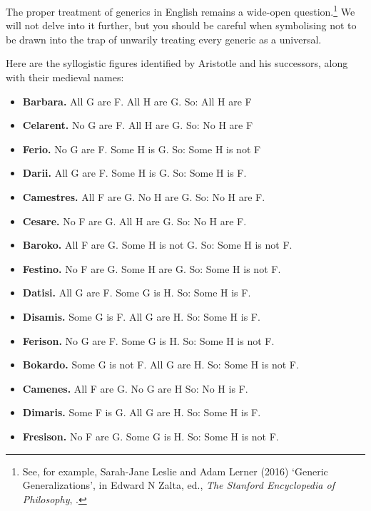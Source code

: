 The proper treatment of generics in English remains a wide-open question.\footnote{See, for example, Sarah-Jane Leslie and Adam Lerner (2016) `Generic Generalizations', in Edward N Zalta, ed., \emph{The Stanford Encyclopedia of Philosophy}, .} We will not delve into it further, but you should be careful when symbolising not to be drawn into the trap of unwarily treating every generic as a universal.




\practiceproblems
\problempart
\label{pr.BarbaraEtc}
Here are the syllogistic figures identified by Aristotle and his successors, along with their medieval names:
\begin{itemize}
	\item \textbf{Barbara.} All G are F. All H are G. So:  All H are F
	\item \textbf{Celarent.} No G are F. All H are G. So: No H are F
	\item \textbf{Ferio.} No G are F. Some H is G. So: Some H is not F
	\item \textbf{Darii.} All G are F. Some H is G. So: Some H is F.
	\item \textbf{Camestres.} All F are G. No H are G. So: No H are F.
	\item \textbf{Cesare.} No F are G. All H are G. So: No H are F.
	\item \textbf{Baroko.} All F are G. Some H is not G. So: Some H is not F.
	\item \textbf{Festino.} No F are G. Some H are G. So: Some H is not F.
	\item \textbf{Datisi.} All G are F. Some G is H. So: Some H is F.
	\item \textbf{Disamis.} Some G is F. All G are H. So: Some H is F.
	\item \textbf{Ferison.} No G are F. Some G is H. So: Some H is not F.
	\item \textbf{Bokardo.} Some G is not F. All G are H. So:  Some H is not F.
	\item \textbf{Camenes.} All F are G. No G are H So: No H is F.
	\item \textbf{Dimaris.} Some F is G. All G are H. So: Some H is F.
	\item \textbf{Fresison.} No F are G. Some G is H. So: Some H is not F.
\end{itemize}
